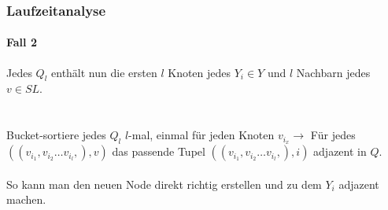 \begin{frame}
\frametitle{Laufzeitanalyse}
\framesubtitle{Fall 2}


Jedes $Q_l$ enthält nun die ersten $l$ Knoten jedes $Y_i \in Y$ und $l$ Nachbarn jedes $v \in SL$. \\
\ \\
\ \\
Bucket-sortiere jedes $Q_l$ $l$-mal, einmal für jeden Knoten $v_{i_x} \rightarrow$ Für jedes $((v_{i_1}, v_{i_2} \dots v_{i_l},), v)$ das passende Tupel $((v_{i_1}, v_{i_2} \dots v_{i_l},), i)$ adjazent in $Q$. \\
\ \\
So kann man den neuen Node direkt richtig erstellen und zu dem $Y_i$ adjazent machen. \\
\ \\

\end{frame}




















